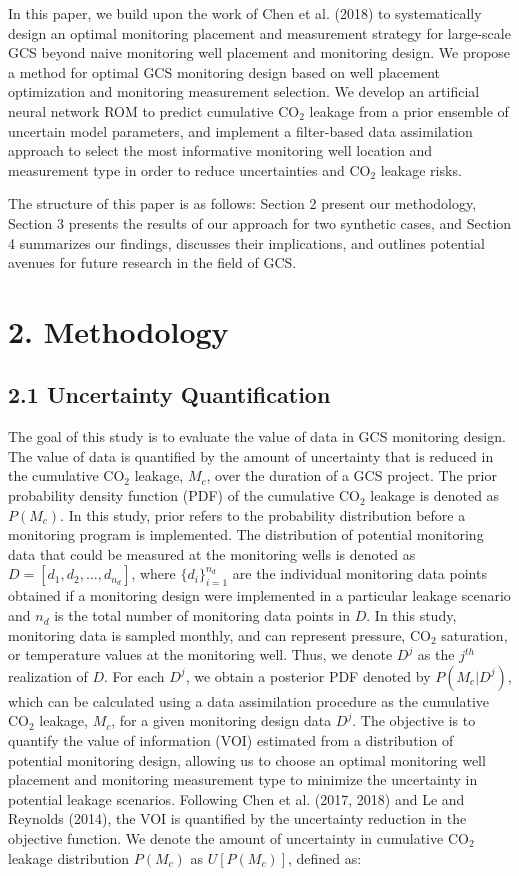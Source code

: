 \documentclass[10pt, twoside]{article}
\begin{document}
In this paper, we build upon the work of Chen et al. (2018) to systematically design an optimal monitoring placement and measurement strategy for large-scale GCS beyond naive monitoring well placement and monitoring design. We propose a method for optimal GCS monitoring design based on well placement optimization and monitoring measurement selection. We develop an artificial neural network ROM to predict cumulative CO$_2$ leakage from a prior ensemble of uncertain model parameters, and implement a filter-based data assimilation approach to select the most informative monitoring well location and measurement type in order to reduce uncertainties and CO$_2$ leakage risks. 

The structure of this paper is as follows: Section 2 present our methodology, Section 3 presents the results of our approach for two synthetic cases, and Section 4 summarizes our findings, discusses their implications, and outlines potential avenues for future research in the field of GCS.

\section*{\textbf{2. Methodology}}

\subsection*{2.1 Uncertainty Quantification}
The goal of this study is to evaluate the value of data in GCS monitoring design. The value of data is quantified by the amount of uncertainty that is reduced in the cumulative CO$_2$ leakage, $M_c$, over the duration of a GCS project. The prior probability density function (PDF) of the cumulative CO$_2$ leakage is denoted as $P(M_c)$. In this study, prior refers to the probability distribution before a monitoring program is implemented. The distribution of potential monitoring data that could be measured at the monitoring wells is denoted as $D=[d_1,d_2,\ldots,d_{n_d}]$, where $\{d_i\}_{i=1}^{n_d}$ are the individual monitoring data points obtained if a monitoring design were implemented in a particular leakage scenario and $n_d$ is the total number of monitoring data points in $D$. In this study, monitoring data is sampled monthly, and can represent pressure, CO$_2$ saturation, or temperature values at the monitoring well. Thus, we denote $D^j$ as the $j^{th}$ realization of $D$. For each $D^j$, we obtain a posterior PDF denoted by $P(M_c \vert D^j)$, which can be calculated using a data assimilation procedure as the cumulative CO$_2$ leakage, $M_c$, for a given monitoring design data $D^j$. The objective is to quantify the value of information (VOI) estimated from a distribution of potential monitoring design, allowing us to choose an optimal monitoring well placement and monitoring measurement type to minimize the uncertainty in potential leakage scenarios.
Following Chen et al. (2017, 2018) and Le and Reynolds (2014), the VOI is quantified by the uncertainty reduction in the objective function. We denote the amount of uncertainty in cumulative CO$_2$ leakage distribution $P(M_c)$ as $U[P(M_c)]$, defined as:
\end{document}
